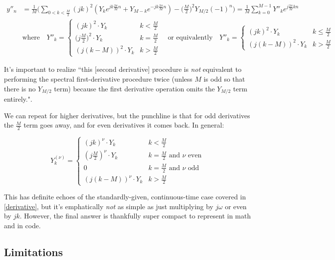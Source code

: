 \documentclass[10pt]{article}
\begin{document}
\begin{align*}
y''_n &= \frac{1}{M} \Big( \sum_{0 < k < \frac{M}{2}} (jk)^2 (Y_k e^{j k \frac{2\pi}{M}n} + Y_{M-k} e^{-j k \frac{2\pi}{M}n}) - \Big(\frac{M}{2}\Big)^2 Y_{M/2} (-1)^n \Big) = \frac{1}{M} \sum_{k = 0}^{M-1} Y''_k e^{j\frac{2\pi}{M}kn} \\
& \text{where} \quad Y''_k = \begin{cases} (j k)^2 \cdot Y_k & k < \frac{M}{2} \\ \Big(j\frac{M}{2}\Big)^2 \cdot Y_k & k = \frac{M}{2} \\ (j(k - M))^2 \cdot Y_k & k > \frac{M}{2} \end{cases} \quad \text{or equivalently} \quad Y''_k = \begin{cases} (j k)^2 \cdot Y_k & k \leq \frac{M}{2} \\ (j(k - M))^2 \cdot Y_k & k > \frac{M}{2} \end{cases}
\end{align*}

It's important to realize ``this [second derivative] procedure is \textit{not} equivalent to performing the spectral first-derivative procedure twice (unless $M$ is odd so that there is no $Y_{M/2}$ term) because the first derivative operation omits the $Y_{M/2}$ term entirely."\cite{johnson}.

We can repeat for higher derivatives, but the punchline is that for odd derivatives the $\frac{M}{2}$ term goes away, and for even derivatives it comes back. In general:

\begin{equation}\label{Y_nu}
Y^{(\nu)}_k = \begin{cases} (j k)^\nu \cdot Y_k & k < \frac{M}{2} \\ (j \frac{M}{2})^\nu \cdot Y_k & k = \frac{M}{2} \text{ and } \nu \text{ even} \\ 0 & k = \frac{M}{2} \text{ and } \nu \text{ odd} \\ (j(k - M))^\nu \cdot Y_k & k > \frac{M}{2} \end{cases}
\end{equation}

This has definite echoes of the standardly-given, continuous-time case covered in \autoref{derivative}, but it's emphatically \textit{not} as simple as just multiplying by $j\omega$ or even by $j k$. However, the final answer is thankfully super compact to represent in math and in code.

\subsection{Limitations}
\end{document}
